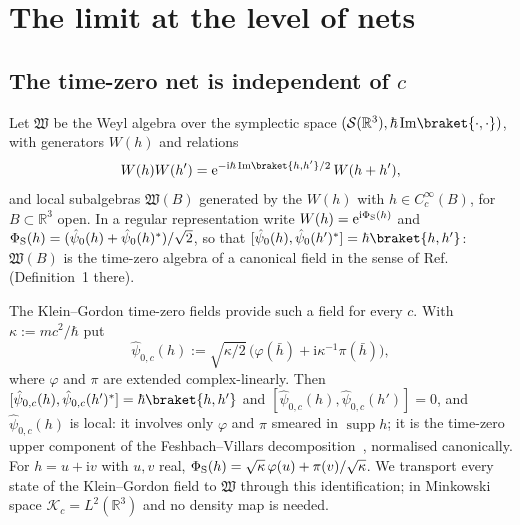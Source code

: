 \documentclass[%
 aip,
 jmp,
 amsmath,amssymb,
 reprint, onecolumn
]{revtex4-1}
\theoremstyle{definition}
\theoremstyle{remark}
\newcommand{\R}{\mathbb{R}}
\newcommand{\K}{\mathcal{K}}
\newcommand{\rmi}{\mathrm{i}}
\newcommand{\rme}{\mathrm{e}}
\DeclareMathOperator{\supp}{supp}
\begin{document}
\section{The limit at the level of nets}\label{sec:net}

\subsection{The time-zero net is independent of $c$}

Let $\mathfrak W$ be the Weyl algebra over the symplectic space
$(\mathcal S(\R^3),\hbar\,\mathrm{Im}\braket{\cdot,\cdot})$, with
generators $W(h)$ and relations
\[
W(h)W(h')=\rme^{-\rmi\hbar\,\mathrm{Im}\braket{h,h'}/2}\,W(h+h'),
\]
and local subalgebras $\mathfrak W(B)$ generated by the $W(h)$ with
$h\in C_c^\infty(B)$, for $B\subset\R^3$ open. In a regular
representation write $W(h)=\rme^{\rmi\Phi_{\rm S}(h)}$ and
$\Phi_{\rm S}(h)=(\hat\psi_0(h)+\hat\psi_0(h)^*)/\sqrt2$, so that
$[\hat\psi_0(h),\hat\psi_0(h')^*]=\hbar\braket{h,h'}$: $\mathfrak W(B)$ is
the time-zero algebra of a canonical field in the sense of
Ref.~
(Definition~1 there).

The Klein--Gordon time-zero fields provide such a field for every $c$.
With $\kappa:=mc^2/\hbar$ put
\begin{equation}\label{eq:local-field}
\hat\psi_{0,c}(h):=\sqrt{\kappa/2}\,\bigl(\varphi(\bar h)+\rmi\kappa^{-1}
\pi(\bar h)\bigr),
\end{equation}
where $\varphi$ and $\pi$ are extended complex-linearly. Then
$[\hat\psi_{0,c}(h),\hat\psi_{0,c}(h')^*]=\hbar\braket{h,h'}$ and
$[\hat\psi_{0,c}(h),\hat\psi_{0,c}(h')]=0$, and $\hat\psi_{0,c}(h)$ is
local: it involves only $\varphi$ and $\pi$ smeared in $\supp h$; it is
the time-zero upper component of the Feshbach--Villars
decomposition~\cite{FeshbachVillars1958}, normalised canonically. For
$h=u+\rmi v$ with $u,v$ real, $\Phi_{\rm S}(h)=\sqrt\kappa\,\varphi(u)+
\pi(v)/\sqrt\kappa$. We transport every state of the Klein--Gordon field
to $\mathfrak W$ through this identification; in Minkowski space
$\K_c=L^2(\R^3)$ and no density map is needed.
\end{document}
